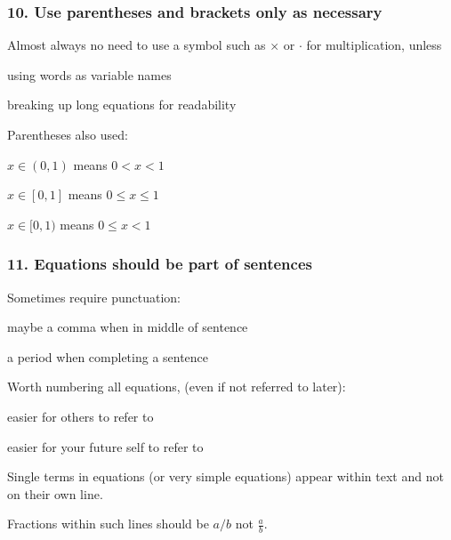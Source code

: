 
\begin{frame}
\frametitle{10. Use parentheses and brackets only as necessary}

Almost always no need to use a symbol such as $\times$ or $\cdot$ for
multiplication, unless
\bi
\item using words as variable names
\item breaking up long equations for readability
\ei

\pause

Parentheses also used:
\bi
\item $x \in (0, 1)$ means $0 < x < 1$
\item $x \in [0, 1]$ means $0 \leq x \leq 1$
\item $x \in [0, 1)$ means $0 \leq x < 1$
\ei

\end{frame}


\begin{frame}
\frametitle{11. Equations should be part of sentences}

Sometimes require punctuation:
\bi
\item maybe a comma when in middle of sentence
\item a period when completing a sentence
\ei

\pause

Worth numbering all equations, (even if not referred to later):
\bi
\item easier for others to refer to
\item easier for your future self to refer to
\ei

\pause

\medskip

Single terms in equations (or very simple equations) appear within
text and not on their own line.

\medskip

Fractions within such lines should be $a/b$ not $\frac{a}{b}$.

\end{frame}


